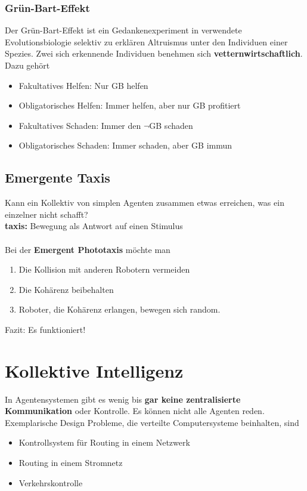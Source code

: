 \documentclass[a4paper]{article}
\begin{document}
\subsubsection{Grün-Bart-Effekt}
Der Grün-Bart-Effekt ist ein Gedankenexperiment in verwendete Evolutionsbiologie selektiv zu erklären Altruismus unter den Individuen einer Spezies. Zwei sich erkennende Individuen benehmen sich \textbf{vetternwirtschaftlich}.\\

Dazu gehört
\begin{itemize}
	\item Fakultatives Helfen: Nur GB helfen
	\item Obligatorisches Helfen: Immer helfen, aber nur GB profitiert
	\item Fakultatives Schaden: Immer den $\neg$GB schaden
	\item Obligatorisches Schaden: Immer schaden, aber GB immun
\end{itemize}
\subsection{Emergente Taxis}
Kann ein Kollektiv von simplen Agenten zusammen etwas erreichen, was ein einzelner nicht schafft?\\
\textbf{taxis:} Bewegung als Antwort auf einen Stimulus\\
\\
Bei der \textbf{Emergent Phototaxis} möchte man
\begin{enumerate}
	\item Die Kollision mit anderen Robotern vermeiden
	\item Die Kohärenz beibehalten
	\item Roboter, die Kohärenz erlangen, bewegen sich random.
\end{enumerate}
Fazit: Es funktioniert!
\newpage

\section{Kollektive Intelligenz}
In Agentensystemen gibt es wenig bis \textbf{gar keine zentralisierte Kommunikation} oder Kontrolle. Es können nicht alle Agenten reden.\\

Exemplarische Design Probleme, die verteilte Computersysteme beinhalten, sind
\begin{itemize}
	\item Kontrollsystem für Routing in einem Netzwerk
	\item Routing in einem Stromnetz
	\item Verkehrskontrolle
\end{itemize}
\end{document}
